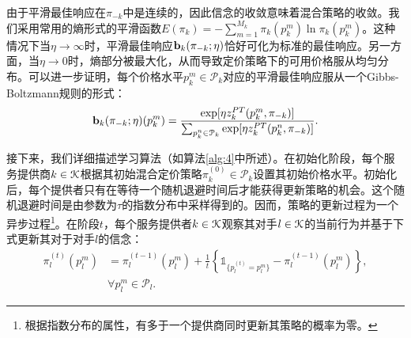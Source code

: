 由于平滑最佳响应在$\pi_{-k}$中是连续的，因此信念的收敛意味着混合策略的收敛。我们采用常用的熵形式的平滑函数$E(\pi_k)=-\sum_{m=1}^{M_k}\pi_k(p_{k}^{m})\ln \pi_k(p_{k}^{m})$。这种情况下当$\eta\rightarrow\infty$时，平滑最佳响应$\bold{b}_k(\pi_{-k}; \eta)$恰好可化为标准的最佳响应。另一方面，当$\eta\rightarrow0$时，熵部分被最大化，从而导致定价策略下的可用价格服从均匀分布。可以进一步证明，每个价格水平$p_k^{m}\in\mathcal{P}_k$对应的平滑最佳响应服从一个Gibbs-Boltzmann规则的形式：
\begin{equation}\label{eq:gibbs}
\bold{b}_k(\pi_{-k};\eta)(p_k^{m})=\frac{\exp[\eta z^{PT}_k(p_k^{m}, \pi_{-k})]}{\sum_{p_k^n\in\mathcal{P}_k}\exp[\eta z^{PT}_k(p_k^n, \pi_{-k})]}.
\end{equation}

接下来，我们详细描述学习算法（如算法\ref{alg:4}中所述）。在初始化阶段，每个服务提供商$k\in\mathcal{K}$根据其初始混合定价策略$\pi_k^{(0)}\in\mathcal{P}_k$设置其初始价格水平。初始化后，每个提供者只有在等待一个随机退避时间后才能获得更新策略的机会。这个随机退避时间是由参数为$\tau$的指数分布中采样得到的。因而，策略的更新过程为一个异步过程\footnote{根据指数分布的属性，有多于一个提供商同时更新其策略的概率为零。}。在阶段$t$，每个服务提供者$k\in\mathcal{K}$观察其对手$l\in\mathcal{K}$的当前行为并基于下式更新其对于对手$l$的信念：
\begin{align}\label{eq:belief}
\pi_l^{(t)}(p_l^m)&=\pi_l^{(t-1)}(p_l^m)+\frac{1}{t}\left\{\mathds{1}_{\{p_l^{(t)}=p_l^m\}}-\pi_l^{(t-1)}(p_l^m)\right\},\nonumber\\
&\forall p^m_l\in\mathcal{P}_l.
\end{align}

